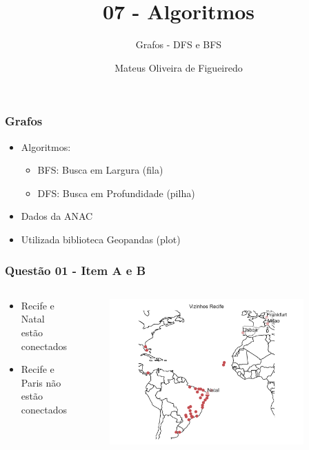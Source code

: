 \documentclass[aspectratio=169,usenames,dvipsnames]{beamer}
\title{07 - Algoritmos}
\subtitle{Grafos - DFS e BFS}
\author{Mateus Oliveira de Figueiredo}
\date{}
\begin{document}
\begin{frame}
\titlepage
\end{frame}

\begin{frame}
\frametitle{Grafos}
\vfill
\begin{itemize}
  \item  Algoritmos:
  \begin{itemize}
    \item BFS: Busca em Largura (fila)
    \item DFS: Busca em Profundidade (pilha)
  \end{itemize}
  \item Dados da ANAC 
  \item Utilizada biblioteca Geopandas (plot)
\end{itemize}
\vfill
\end{frame}

\begin{frame}
  \frametitle{Questão 01 - Item A e B}
  \begin{columns}
    \begin{column}{0.3\textwidth}
      \begin{itemize}
        \item Recife e Natal estão conectados
        \item Recife e Paris não estão conectados
      \end{itemize}
    \end{column}
    \begin{column}{0.7\textwidth}
      \begin{figure}
        \includegraphics[width=0.9\textwidth]{figs/vizinhos_recife.pdf}
      \end{figure}
    \end{column}
  \end{columns}
\end{frame}
\end{document}
